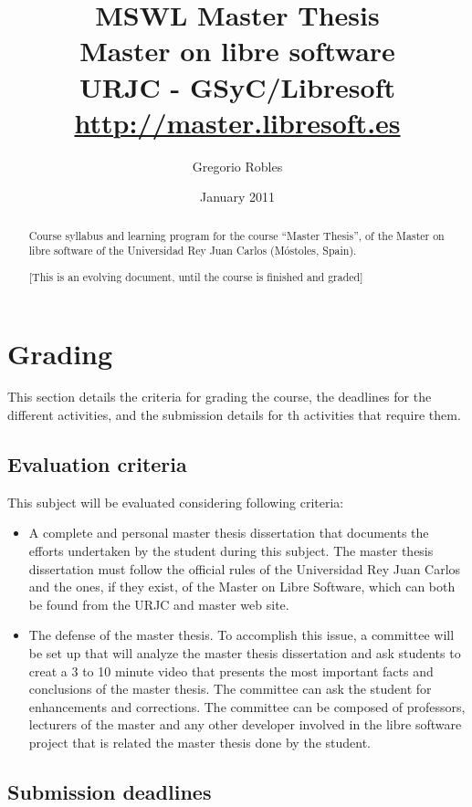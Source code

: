 \documentclass[a4paper]{article}
\title{MSWL Master Thesis \\
Master on libre software \\
URJC - GSyC/Libresoft \\
\url{http://master.libresoft.es}}
\author{Gregorio Robles}
\date{January 2011}
\begin{document}
\maketitle

\begin{abstract}
Course syllabus and learning program for the course ``Master Thesis'', of the Master on libre software of the Universidad Rey Juan Carlos (Móstoles, Spain).

[This is an evolving document, until the course is finished and graded]
\end{abstract}

\tableofcontents

\section{Grading}

This section details the criteria for grading the course, the deadlines for the different activities, and the submission details for th activities that require them.

\subsection{Evaluation criteria}
\label{sub:evaluation-criteria}

This subject will be evaluated considering following criteria:

\begin{itemize}

\item A complete and personal master thesis dissertation that documents the efforts undertaken by the student during this subject. The master thesis dissertation must follow
the official rules of the Universidad Rey Juan Carlos and the ones, if they exist, of the Master on Libre Software, which can both be found from the URJC and master web site.

\item The defense of the master thesis. To accomplish this issue, a committee will be set up that will analyze the master thesis dissertation and ask students to creat a 3 to 10 minute video that presents the most important facts and conclusions of the master thesis. The committee can ask the student for enhancements and corrections. The committee can be composed of professors, lecturers of the master and any other developer involved in the libre software project that is related the master thesis done by the student.

\end{itemize}

\subsection{Submission deadlines}
\end{document}
